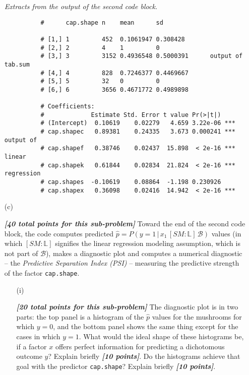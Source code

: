 \documentclass[12pt]{article}
\newcommand{\given}{\, | \,}
\newcommand{\bi}[1]{\textbf{\textit{#1}}}
\begin{document}
\begin{itemize}
\begin{table}[t!]

\centering

\caption{\textit{Extracts from the output of the second code block.}}

\begin{verbatim}
          #      cap.shape n    mean      sd       

          # [1,] 1         452  0.1061947 0.308428 
          # [2,] 2         4    1         0        
          # [3,] 3         3152 0.4936548 0.5000391      output of tab.sum
          # [4,] 4         828  0.7246377 0.4469667
          # [5,] 5         32   0         0        
          # [6,] 6         3656 0.4671772 0.4989898

          # Coefficients:
          #             Estimate Std. Error t value Pr(>|t|)    
          # (Intercept)  0.10619    0.02279   4.659 3.22e-06 ***
          # cap.shapec   0.89381    0.24335   3.673 0.000241 ***   output of
          # cap.shapef   0.38746    0.02437  15.898  < 2e-16 ***   linear
          # cap.shapek   0.61844    0.02834  21.824  < 2e-16 ***   regression
          # cap.shapes  -0.10619    0.08864  -1.198 0.230926    
          # cap.shapex   0.36098    0.02416  14.942  < 2e-16 ***
\end{verbatim}

\label{t:data-analysis-1}

\end{table}

\item[(c)]

\bi{[40 total points for this sub-problem]} Toward the end of the second code block, the code computes predicted $\hat{ p } = P ( y = 1 \given x_1 \, [ SM \! \! : \! \mathbb{ L } ] \, \mathcal{ B } )$ values (in which $[ SM \! \! : \! \mathbb{ L } ]$ signifies the linear regression modeling assumption, which is not part of $\mathcal{ B }$), makes a diagnostic plot and computes a numerical diagnostic -- the \textit{Predictive Separation Index (PSI)} -- measuring the predictive strength of the factor \texttt{cap.shape}.

\begin{itemize}

\item[(i)]

\bi{[20 total points for this sub-problem]} The diagnostic plot is in two parts: the top panel is a histogram of the $\hat{ p }$ values for the mushrooms for which $y = 0$, and the bottom panel shows the same thing except for the cases in which $y = 1$. What would the ideal shape of these histograms be, if a factor $x$ offers perfect information for predicting a dichotomous outcome $y$? Explain briefly \bi{[10 points]}. Do the histograms achieve that goal with the predictor \texttt{cap.shape}? Explain briefly \bi{[10 points]}.


\end{itemize}
\end{itemize}
\end{document}
